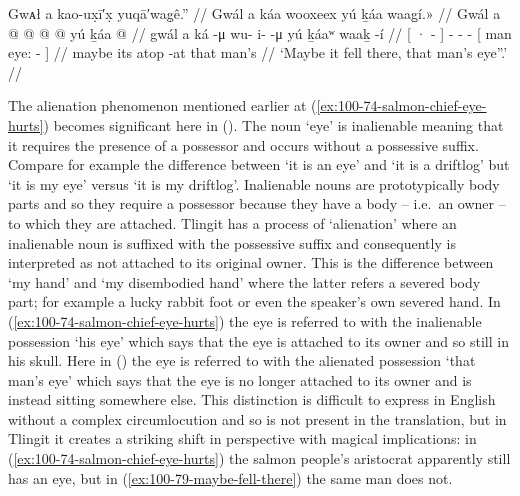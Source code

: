 \ex\label{ex:100-79-maybe-fell-there}%
%
\begingl
	\glpreamble	Gwᴀł a kao-ux̣ī′x̣ yuqā′wag̣ê.” //
	\glpreamble	Gwál a káa wooxeex yú ḵáa waag̱í.\!» //
	\gla	Gwál
		{} a  @ {} {}
		 @ {} @ {} @ {}
		{} yú ḵáa  @ {} {} //
	\glb	gwál
		{} a ká -μ {}
		wu- i-  -μ
		{} yú ḵáaʷ waaḵ -í {} //
	\glc	{}
		{}[ ·  - {}]
		- -  -
		{}[  man eye: - {}] //
	\gld	maybe
		{} its atop -at {}
		 {} {} {}
		{} that man’s  {} {} //
	\glft 	‘Maybe it fell there, that man’s eye”.’
		//
\endgl
\xe

The alienation phenomenon mentioned earlier at (\ref{ex:100-74-salmon-chief-eye-hurts}) becomes significant here in (\lastx).
The noun  ‘eye’ is inalienable meaning that it requires the presence of a possessor and occurs without a possessive suffix.
Compare for example the difference between  ‘it is an eye’ and  ‘it is a driftlog’ but  ‘it is my eye’ versus  ‘it is my driftlog’.
Inalienable nouns are prototypically body parts and so they require a possessor because they have a body – i.e.\ an owner – to which they are attached.
Tlingit has a process of ‘alienation’ where an inalienable noun is suffixed with the possessive suffix and consequently is interpreted as not attached to its original owner.
This is the difference between  ‘my hand’ and  ‘my disembodied hand’ where the latter refers a severed body part; for example a lucky rabbit foot or even the speaker’s own severed hand.
In (\ref{ex:100-74-salmon-chief-eye-hurts}) the eye is referred to with the inalienable possession  ‘his eye’ which says that the eye is attached to its owner and so still in his skull.
Here in (\lastx) the eye is referred to with the alienated possession  ‘that man’s eye’ which says that the eye is no longer attached to its owner and is instead sitting somewhere else.
This distinction is difficult to express in English without a complex circumlocution and so is not present in the translation, but in Tlingit it creates a striking shift in perspective with magical implications: in (\ref{ex:100-74-salmon-chief-eye-hurts}) the salmon people’s aristocrat apparently still has an eye, but in (\ref{ex:100-79-maybe-fell-there}) the same man does not.

